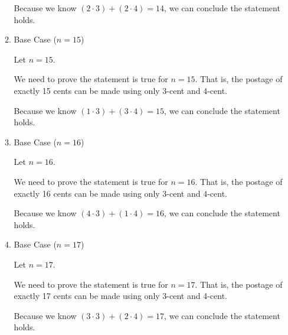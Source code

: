 \documentclass[12pt]{article}
\begin{document}
\begin{itemize}
\begin{mdframed}
\begin{enumerate}[1.]
\begin{mdframed}
            \bigskip

            Because we know $(2 \cdot 3) + (2 \cdot 4)=14$, we can conclude the statement holds.

            \end{mdframed}

            \item Base Case ($n = 15$)

            \begin{mdframed}
            Let $n = 15$.

            \bigskip

            We need to prove the statement is true for $n = 15$. That is, the
            postage of exactly 15 cents can be made using only 3-cent and 4-cent.

            \bigskip

            Because we know $(1 \cdot 3) + (3 \cdot 4)=15$, we can conclude the statement holds.

            \end{mdframed}

            \item Base Case ($n = 16$)

            \begin{mdframed}
            Let $n = 16$.

            \bigskip

            We need to prove the statement is true for $n = 16$. That is, the
            postage of exactly 16 cents can be made using only 3-cent and 4-cent.

            \bigskip

            Because we know $(4 \cdot 3) + (1 \cdot 4)=16$, we can conclude the statement holds.

            \end{mdframed}

            \item Base Case ($n = 17$)

            \begin{mdframed}
            Let $n = 17$.

            \bigskip

            We need to prove the statement is true for $n = 17$. That is, the
            postage of exactly 17 cents can be made using only 3-cent and 4-cent.

            \bigskip

            Because we know $(3 \cdot 3) + (2 \cdot 4)=17$, we can conclude the statement holds.


\end{mdframed}
\end{enumerate}
\end{mdframed}
\end{itemize}
\end{document}
